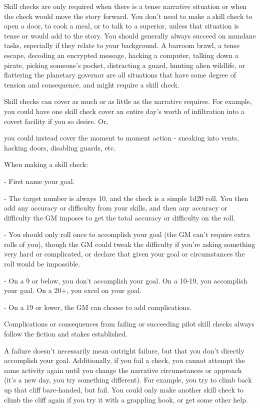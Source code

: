 Skill checks are only required when there is a tense narrative situation or when the check
would move the story forward. You don’t need to make a skill check to open a door, to cook a
meal, or to talk to a superior, unless that situation is tense or would add to the story. You should
generally always succeed on mundane tasks, especially if they relate to your background. A
barroom brawl, a tense escape, decoding an encrypted message, hacking a computer, talking
down a pirate, picking someone’s pocket, distracting a guard, hunting alien wildlife, or flattering
the planetary governor are all situations that have some degree of tension and consequence, and
might require a skill check.


Skill checks can cover as much or as little as the narrative requires. For example, you could have
one skill check cover an entire day’s worth of infiltration into a covert facility if you so desire. Or,




you could instead cover the moment to moment action - sneaking into vents, hacking doors,
disabling guards, etc.

When making a skill check:

    -    First name your goal.

    -    The target number is always 10, and the check is a simple 1d20 roll. You then add any
         accuracy or difficulty from your skills, and then any accuracy or difficulty the GM imposes
         to get the total accuracy or difficulty on the roll.

    -    You should only roll once to accomplish your goal (the GM can’t require extra rolls of
         you), though the GM could tweak the difficulty if you’re asking something very hard or
         complicated, or declare that given your goal or circumstances the roll would be
         impossible.

    -    On a 9 or below, you don’t accomplish your goal. On a 10-19, you accomplish your goal.
         On a 20+, you excel on your goal.

    -    On a 19 or lower, the GM can choose to add complications.


Complications or consequences from failing or succeeding pilot skill checks always follow the
fiction and stakes established.


A failure doesn’t necessarily mean outright failure, but that you don’t directly accomplish your
goal. Additionally, if you fail a check, you cannot attempt the same activity again until you change
the narrative circumstances or approach (it’s a new day, you try something different). For
example, you try to climb back up that cliff bare-handed, but fail. You could only make another
skill check to climb the cliff again if you try it with a grappling hook, or get some other help.


